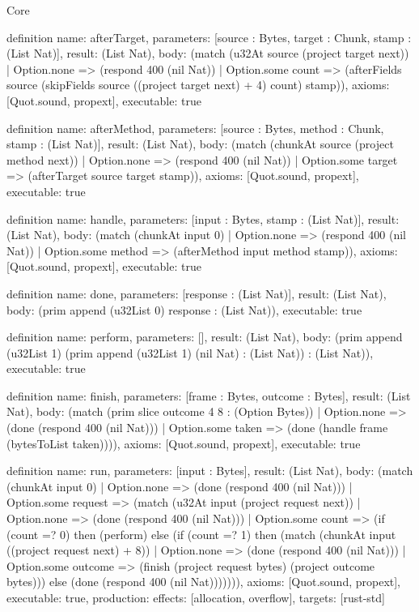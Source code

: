 \begin{lexlean}{Core}
\begin{semanticmodule}
definition{
  name: afterTarget,
  parameters: [source : Bytes, target : Chunk, stamp : (List Nat)],
  result: (List Nat),
  body: (match (u32At source (project target next))
    | Option.none => (respond 400 (nil Nat))
    | Option.some count => (afterFields source (skipFields source ((project target next) + 4) count) stamp)),
  axioms: [Quot.sound, propext],
  executable: true
}

definition{
  name: afterMethod,
  parameters: [source : Bytes, method : Chunk, stamp : (List Nat)],
  result: (List Nat),
  body: (match (chunkAt source (project method next))
    | Option.none => (respond 400 (nil Nat))
    | Option.some target => (afterTarget source target stamp)),
  axioms: [Quot.sound, propext],
  executable: true
}

definition{
  name: handle,
  parameters: [input : Bytes, stamp : (List Nat)],
  result: (List Nat),
  body: (match (chunkAt input 0)
    | Option.none => (respond 400 (nil Nat))
    | Option.some method => (afterMethod input method stamp)),
  axioms: [Quot.sound, propext],
  executable: true
}

definition{
  name: done,
  parameters: [response : (List Nat)],
  result: (List Nat),
  body: (prim append (u32List 0) response : (List Nat)),
  executable: true
}

definition{
  name: perform,
  parameters: [],
  result: (List Nat),
  body: (prim append (u32List 1) (prim append (u32List 1) (nil Nat) : (List Nat)) : (List Nat)),
  executable: true
}

definition{
  name: finish,
  parameters: [frame : Bytes, outcome : Bytes],
  result: (List Nat),
  body: (match (prim slice outcome 4 8 : (Option Bytes))
    | Option.none => (done (respond 400 (nil Nat)))
    | Option.some taken => (done (handle frame (bytesToList taken)))),
  axioms: [Quot.sound, propext],
  executable: true
}

definition{
  name: run,
  parameters: [input : Bytes],
  result: (List Nat),
  body: (match (chunkAt input 0)
    | Option.none => (done (respond 400 (nil Nat)))
    | Option.some request => (match (u32At input (project request next))
      | Option.none => (done (respond 400 (nil Nat)))
      | Option.some count => (if (count =? 0) then (perform) else (if (count =? 1) then (match (chunkAt input ((project request next) + 8))
        | Option.none => (done (respond 400 (nil Nat)))
        | Option.some outcome => (finish (project request bytes) (project outcome bytes))) else (done (respond 400 (nil Nat))))))),
  axioms: [Quot.sound, propext],
  executable: true,
  production: {effects: [allocation, overflow], targets: [rust-std]}
}
\end{semanticmodule}
\end{lexlean}
